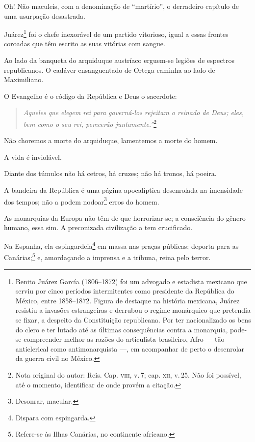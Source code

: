 Oh! Não maculeis, com a denominação de ``martírio'', o derradeiro capítulo
de uma usurpação desastrada.

Juárez\footnote{Benito Juárez García (1806--1872) foi um advogado e \label{juarez}
  estadista mexicano que serviu por cinco períodos intermitentes como
  presidente da República do México, entre 1858--1872. Figura de destaque
  na história mexicana, Juárez resistiu a invasões estrangeiras e
  derrubou o regime monárquico que pretendia se fixar, a despeito da
  Constituição republicana. Por ter nacionalizado os bens do clero e ter
  lutado até as últimas consequências contra a monarquia, pode-se
  compreender melhor as razões do articulista brasileiro, Afro ---
  tão anticlerical como antimonarquista ---, em acompanhar de perto o
  desenrolar da guerra civil no México.} foi o chefe inexorável de um
partido vitorioso, igual a essas frontes coroadas que têm escrito as
suas vitórias com sangue.

Ao lado da banqueta do arquiduque austríaco erguem-se legiões de
espectros republicanos. O cadáver ensanguentado de Ortega caminha ao
lado de Maximiliano.

O Evangelho é o código da República e Deus o sacerdote: 

\begin{quote}
\emph{Aqueles
que elegem rei para governá-los rejeitam o reinado de Deus; eles, bem
como o seu rei, perecerão juntamente.''}\footnote{Nota original do
  autor: Reis. Cap. \textsc{viii}, v.\,7; cap. \textsc{xii}, v.\,25. Não foi possível, até o momento, identificar de onde provém a citação.}
  \end{quote}

Não choremos a morte do arquiduque, lamentemos a morte do homem.

A vida é inviolável.

Diante dos túmulos não há cetros, há cruzes; não há tronos, há poeira.

A bandeira da República é uma página apocalíptica desenrolada na
imensidade dos tempos; não a podem nodoar\footnote{Desonrar, macular.}
erros do homem.

As monarquias da Europa não têm de que horrorizar-se; a consciência do
gênero humano, essa sim. A preconizada civilização a tem crucificado.

Na Espanha, ela espingardeia\footnote{Dispara com espingarda.} em
massa nas praças públicas; deporta para as Canárias;\footnote{Refere-se
  às Ilhas Canárias, no continente africano.} e, amordaçando a imprensa
e a tribuna, reina pelo terror.


